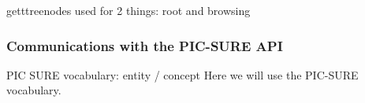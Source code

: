 getttreenodes used for 2 things: root and browsing


    












\subsubsection{Communications with the PIC-SURE API}
PIC SURE vocabulary: entity / concept
Here we will use the PIC-SURE vocabulary.

